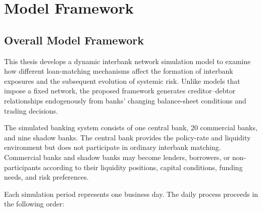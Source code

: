 \chapter{Model Framework}

\section{Overall Model Framework}

This thesis develops a dynamic interbank network simulation model to
examine how different loan-matching mechanisms affect the formation of
interbank exposures and the subsequent evolution of systemic risk.
Unlike models that impose a fixed network, the proposed framework
generates creditor--debtor relationships endogenously from banks'
changing balance-sheet conditions and trading decisions.

The simulated banking system consists of one central bank, 20 commercial
banks, and nine shadow banks. The central bank provides the policy-rate
and liquidity environment but does not participate in ordinary interbank
matching. Commercial banks and shadow banks may become lenders,
borrowers, or non-participants according to their liquidity positions,
capital conditions, funding needs, and risk preferences.

Each simulation period represents one business day. The daily process
proceeds in the following order:

